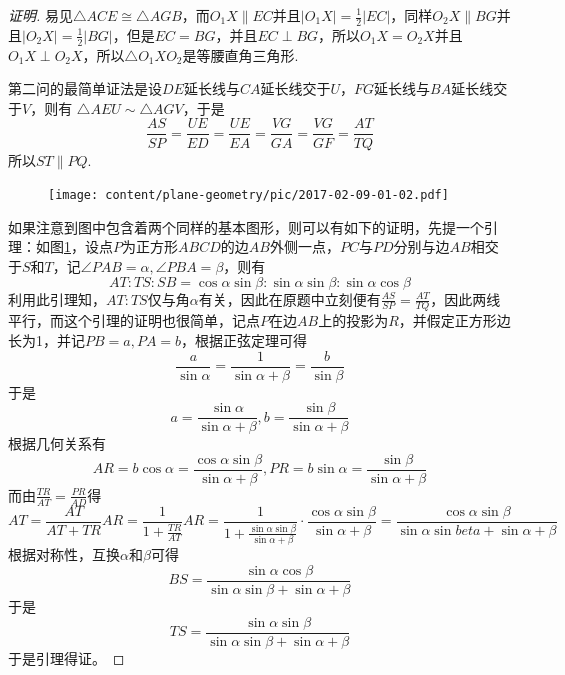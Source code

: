 \begin{proof}[证明]
  易见$\triangle ACE \cong \triangle AGB$，而$O_{1}X \parallel EC$并且$|O_{1}X|=\frac{1}{2}|EC|$，同样$O_2X \parallel BG$并且$|O_2X|=\frac{1}{2}|BG|$，但是$EC=BG$，并且$EC \perp BG$，所以$O_1X=O_2X$并且$O_1X \perp O_2X$，所以$\triangle O_{1}XO_{2}$是等腰直角三角形.

  第二问的最简单证法是设$DE$延长线与$CA$延长线交于$U$，$FG$延长线与$BA$延长线交于$V$，则有 $\triangle AEU \sim \triangle AGV$，于是
  \begin{equation*}
    \frac{AS}{SP}=\frac{UE}{ED}=\frac{UE}{EA}=\frac{VG}{GA}=\frac{VG}{GF}=\frac{AT}{TQ}
  \end{equation*}
  所以$ST \parallel PQ$.

\begin{figure}[htbp]
  \centering
\texttt{[image: content/plane-geometry/pic/2017-02-09-01-02.pdf]}
\caption{}
\label{fig:2017-02-09-01-02}
\end{figure}

  如果注意到图中包含着两个同样的基本图形，则可以有如下的证明，先提一个引理：如图\ref{fig:2017-02-09-01-02}，设点$P$为正方形$ABCD$的边$AB$外侧一点，$PC$与$PD$分别与边$AB$相交于$S$和$T$，记$\angle PAB=\alpha, \angle PBA=\beta$，则有
  \begin{equation*}
    AT : TS : SB = \cos{\alpha}\sin{\beta} : \sin{\alpha}\sin{\beta} : \sin{\alpha}\cos{\beta}
  \end{equation*}
  利用此引理知，$AT:TS$仅与角$\alpha$有关，因此在原题中立刻便有$\frac{AS}{SP}=\frac{AT}{TQ}$，因此两线平行，而这个引理的证明也很简单，记点$P$在边$AB$上的投影为$R$，并假定正方形边长为1，并记$PB=a, PA=b$，根据正弦定理可得 
  \begin{equation*}
    \frac{a}{\sin{\alpha}}=\frac{1}{\sin{\alpha+\beta}}=\frac{b}{\sin{\beta}}
  \end{equation*}
  于是
  \begin{equation*}
    a=\frac{\sin{\alpha}}{\sin{\alpha+\beta}}, b=\frac{\sin{\beta}}{\sin{\alpha+\beta}}
  \end{equation*}
  根据几何关系有
  \begin{equation*}
    AR=b\cos{\alpha}=\frac{\cos{\alpha}\sin{\beta}}{\sin{\alpha+\beta}}, PR=b\sin{\alpha}=\frac{\sin{\beta}}{\sin{\alpha+\beta}}
  \end{equation*}
  而由$\frac{TR}{AT}=\frac{PR}{AD}$得
  \begin{equation*}
    AT=\frac{AT}{AT+TR}AR=\frac{1}{1+\frac{TR}{AT}}AR
    = \frac{1}{1+\frac{\sin{\alpha}\sin{\beta}}{\sin{\alpha+\beta}}} \cdot \frac{\cos{\alpha}\sin{\beta}}{\sin{\alpha+\beta}}
    = \frac{\cos{\alpha}\sin{\beta}}{\sin{\alpha}\sin{beta}+\sin{\alpha+\beta}}
  \end{equation*}
  根据对称性，互换$\alpha$和$\beta$可得
  \begin{equation*}
    BS = \frac{\sin{\alpha}\cos{\beta}}{\sin{\alpha}\sin{\beta}+\sin{\alpha+\beta}}
  \end{equation*}
  于是
  \begin{equation*}
    TS = \frac{\sin{\alpha}\sin{\beta}}{\sin{\alpha}\sin{\beta}+\sin{\alpha+\beta}}
  \end{equation*}
  于是引理得证。
\end{proof}

